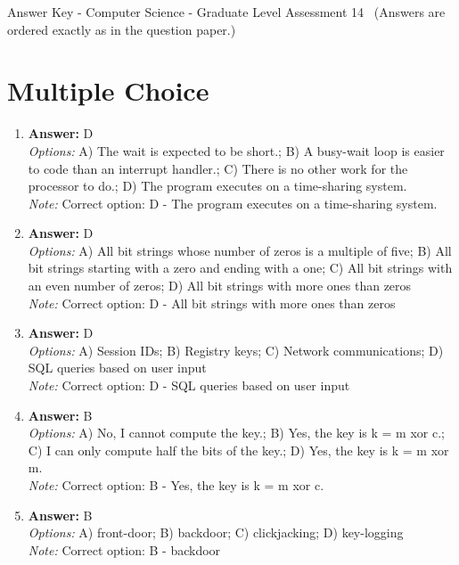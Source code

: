 \documentclass[12pt]{article}
\begin{document}
\begin{center}
Answer Key - Computer Science - Graduate Level Assessment 14 \
\small (Answers are ordered exactly as in the question paper.)
\end{center}

\section*{Multiple Choice}
\begin{enumerate}[label=\arabic*.]
\item \textbf{Answer:} D
\\ \textit{Options:} A) The wait is expected to be short.; B) A busy-wait loop is easier to code than an interrupt handler.; C) There is no other work for the processor to do.; D) The program executes on a time-sharing system.
\\ \textit{Note:} Correct option: D - The program executes on a time-sharing system.
\item \textbf{Answer:} D
\\ \textit{Options:} A) All bit strings whose number of zeros is a multiple of five; B) All bit strings starting with a zero and ending with a one; C) All bit strings with an even number of zeros; D) All bit strings with more ones than zeros
\\ \textit{Note:} Correct option: D - All bit strings with more ones than zeros
\item \textbf{Answer:} D
\\ \textit{Options:} A) Session IDs; B) Registry keys; C) Network communications; D) SQL queries based on user input
\\ \textit{Note:} Correct option: D - SQL queries based on user input
\item \textbf{Answer:} B
\\ \textit{Options:} A) No, I cannot compute the key.; B) Yes, the key is k = m xor c.; C) I can only compute half the bits of the key.; D) Yes, the key is k = m xor m.
\\ \textit{Note:} Correct option: B - Yes, the key is k = m xor c.
\item \textbf{Answer:} B
\\ \textit{Options:} A) front-door; B) backdoor; C) clickjacking; D) key-logging
\\ \textit{Note:} Correct option: B - backdoor
\end{enumerate}
\end{document}
